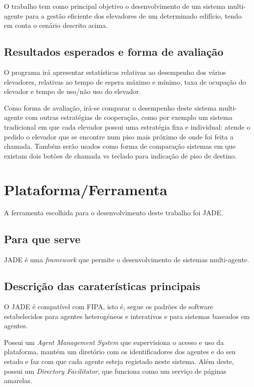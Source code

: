 \documentclass[a4paper]{article}
\begin{document}
O trabalho tem como principal objetivo o desenvolvimento de um sistema multi-agente para a gestão eficiente dos elevadores de um determinado edifício, tendo em conta o cenário descrito acima.

\subsection{Resultados esperados e forma de avaliação} 

O programa irá apresentar estatísticas relativas ao desempenho dos vários elevadores, relativas ao tempo de espera máximo e mínimo, taxa de ocupação do elevador e tempo de uso/não uso do elevador.

Como forma de avaliação, irá-se comparar o desempenho deste sistema multi-agente com outras estratégias de cooperação, como por exemplo um sistema tradicional em que cada elevador possui uma estratégia fixa e individual: atende o pedido o elevador que se encontre num piso mais próximo de onde foi feita a chamada. Também serão usados como forma de comparação sistemas em que existam dois botões de chamada vs teclado para indicação de piso de destino.

\newpage

\section{Plataforma/Ferramenta}

A ferramenta escolhida para o desenvolvimento deste trabalho foi JADE.

\subsection{Para que serve} 

JADE é uma \textit{framework} que permite o desenvolvimento de sistemas multi-agente.

\subsection{Descrição das caraterísticas principais} 

O JADE é compatível com FIPA, isto é, segue os padrões de software estabelecidos para agentes heterogéneos e interativos e para sistemas baseados em agentes.

Possui um \textit{Agent Management System} que supervisiona o acesso e uso da plataforma, mantém um diretório com os identificadores dos agentes e do seu estado e faz com que cada agente esteja registado neste sistema. Além deste, possui um \textit{Directory Facilitator}, que funciona como um serviço de páginas amarelas.
\end{document}
